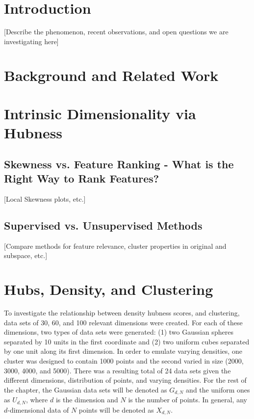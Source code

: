 \documentclass[graybox]{svmult}
\begin{document}
\section{Introduction}
\label{sec:1}
[Describe the phenomenon, recent observations, and open questions we are investigating here]



\section{Background and Related Work}
\label{sec:2}



\section{Intrinsic Dimensionality via Hubness}
\label{sec:3}

\subsection{Skewness vs. Feature Ranking - What is the Right Way to Rank Features? }
\label{subsec:3.1}
[Local Skewness plots, etc.]

\subsection{Supervised vs. Unsupervised Methods }
\label{subsec:3.2}
[Compare methods for feature relevance, cluster properties in original and subspace, etc.]


\section{Hubs, Density, and Clustering}
\label{sec:4}

To investigate the relationship between density hubness scores, and clustering, data sets of 30, 60, and 100 relevant dimensions were created. For each of these dimensions, two types of data sets were generated: (1) two Gaussian spheres separated by 10 units in the first coordinate and (2) two uniform cubes separated by one unit along its first dimension. In order to emulate varying densities, one cluster was designed to contain 1000 points and the second varied in size (2000, 3000, 4000, and 5000). There was a resulting total of 24 data sets given the different dimensions, distribution of points, and varying densities. For the rest of the chapter, the Gaussian data sets will be denoted as $G_{d,N}$ and the uniform ones as $U_{d,N}$, where $d$ is the dimension and $N$ is the number of points. In general, any $d$-dimensional data of $N$ points will be denoted as $X_{d,N}$.
\end{document}

